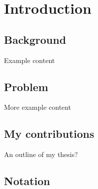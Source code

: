 \chapter{Introduction}
\label{cha:intro}

\section{Background}
\label{sec:TODOexample_section_label}
Example content

\section{Problem}
More example content

\section{My contributions}
An outline of my thesis?

\section{Notation}
